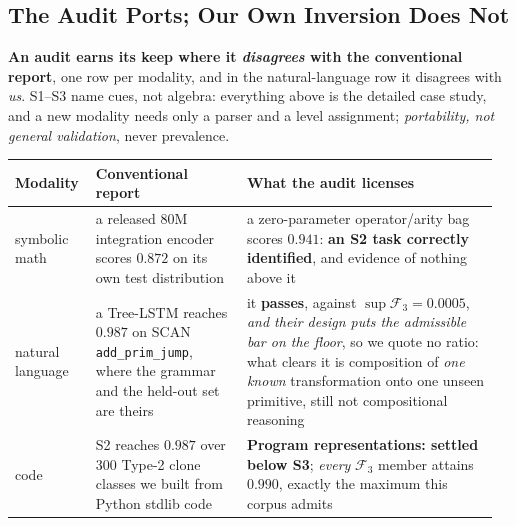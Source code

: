 \subsection{The Audit Ports; Our Own Inversion Does Not}
\label{sec:outside_symbolic}
\label{sec:scan_composition}

\textbf{An audit earns its keep where it \emph{disagrees} with the conventional report}, one row per modality, and in the natural-language row it disagrees with \emph{us}. S1--S3 name cues, not algebra: everything above is the detailed case study, and a new modality needs only a parser and a level assignment; \emph{portability, not general validation}, never prevalence.

{\scriptsize\setlength{\tabcolsep}{3pt}\renewcommand{\arraystretch}{0.94}%
\setlength{\aboverulesep}{0.5pt}\setlength{\belowrulesep}{0.5pt}
\noindent\begin{tabular}{@{}p{0.155\linewidth}p{0.30\linewidth}p{0.505\linewidth}@{}}
\toprule
\textbf{Modality} & \textbf{Conventional report} & \textbf{What the audit licenses} \\
\midrule
symbolic math & a released 80M integration encoder scores $0.872$ on its own test distribution & a zero-parameter operator/arity bag scores $\mathbf{0.941}$: \textbf{an S2 task correctly identified}, and evidence of nothing above it \\
natural language & a Tree-LSTM reaches $\mathbf{0.987}$ on SCAN \texttt{add\_prim\_jump}, where the grammar and the held-out set are theirs & it \textbf{passes}, against $\sup\mathcal{F}_3{=}0.0005$, \emph{and their design puts the admissible bar on the floor}, so we quote no ratio: what clears it is composition of \emph{one known} transformation onto one unseen primitive, still not compositional reasoning \\
code & S2 reaches $0.987$ over $300$ Type-2 clone classes we built from Python stdlib code & \textbf{Program representations: settled below S3}; \emph{every} $\mathcal{F}_3$ member attains $0.990$, exactly the maximum this corpus admits \\
\bottomrule
\end{tabular}}

